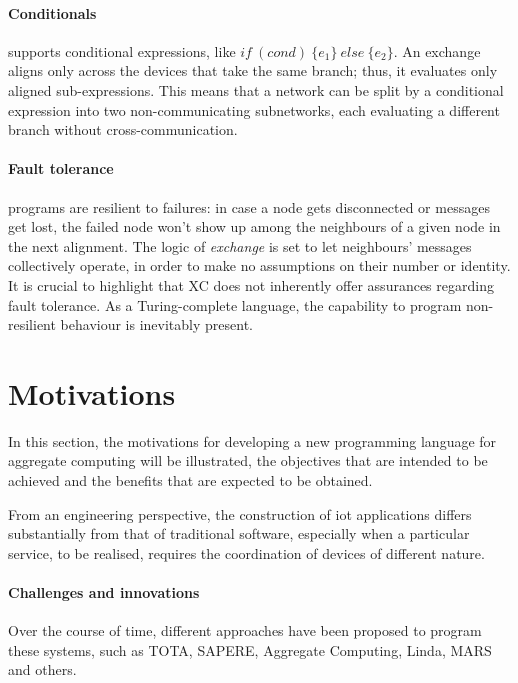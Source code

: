\paragraph{Conditionals}
\xc{} supports conditional expressions, like $if\ (cond)\ \{e_1\}\ else\ \{e_2\}$.
An exchange aligns only across the devices that take the same branch; thus, it evaluates only aligned sub-expressions.
This means that a network can be split by a conditional expression into two non-communicating subnetworks, each
evaluating a different branch without cross-communication.

\paragraph{Fault tolerance}
\xc{} programs are resilient to failures: in case a node gets disconnected or messages get lost, the failed node won't
show up among the neighbours of a given node in the next alignment.
The logic of \emph{exchange} is set to let neighbours' messages collectively operate, in order to make no assumptions
on their number or identity.
It is crucial to highlight that XC does not inherently offer assurances regarding fault tolerance.
As a Turing-complete language, the capability to program non-resilient behaviour is inevitably present.

\section{Motivations}
\label{sec:motivations}

In this section, the motivations for developing a new programming language for aggregate computing will be illustrated,
the objectives that are intended to be achieved and the benefits that are expected to be obtained.

From an engineering perspective, the construction of \ac{iot} applications differs substantially from that of traditional
software, especially when a particular service, to be realised, requires the coordination of devices of different nature.

\paragraph{Challenges and innovations}
Over the course of time, different approaches have been proposed to program these systems, such as TOTA, SAPERE, Aggregate
Computing, Linda, MARS and others. %

